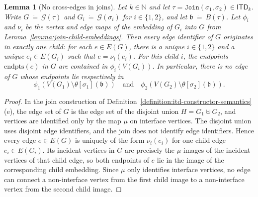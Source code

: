 \documentclass[11pt,a4paper]{article}
\newtheorem{lemma}[theorem]{Lemma}
\newcommand{\treewidthvalue}{k}
\newcommand{\decompositiongraph}[1]{\mathcal{G}(#1)}
\newcommand{\N}{\mathbb{N}}
\newcommand{\abag}{\mathfrak{b}}
\newcommand{\vertexset}[1]{V(#1)}
\newcommand{\edgeset}[1]{E(#1)}
\newcommand{\edgeendpointsname}{\mathrm{endpts}}
\newcommand{\anedge}{e}
\newcommand{\jointype}{\mathtt{Join}}
\newcommand{\topbagname}{B}
\newcommand{\topbag}[1]{\topbagname(#1)}
\newcommand{\allabstractdecompositionstreewidth}[1]{\mathsf{ITD}_{#1}}
\newcommand{\abstractdecomposition}{\tau}
\newcommand{\sigmaabstractdecomposition}{\sigma}
\newcommand{\defeq}{~\dot{=}~}
\newcommand{\topmapname}{\theta}
\newcommand{\topmap}[1]{\topmapname[#1]}
\begin{document}
\begin{lemma}[No cross-edges in joins]
\label{lemma:join-no-cross-edges}
Let $\treewidthvalue\in \N$ and let $\abstractdecomposition=\jointype(\sigmaabstractdecomposition_1,\sigmaabstractdecomposition_2)\in \allabstractdecompositionstreewidth{\treewidthvalue}$.
Write $G\defeq \decompositiongraph{\abstractdecomposition}$ and $G_i\defeq \decompositiongraph{\sigmaabstractdecomposition_i}$ for $i\in\{1,2\}$, and let $\abag\defeq \topbag{\abstractdecomposition}$.
Let $\phi_i$ and $\nu_i$ be the vertex and edge maps of the embedding of $G_i$ into $G$ from Lemma~\ref{lemma:join-child-embeddings}.
Then every edge identifier of $G$ originates in exactly one child: for each $\anedge\in \edgeset{G}$, there is a unique $i\in\{1,2\}$ and a unique $\anedge_i\in\edgeset{G_i}$ such that $\anedge=\nu_i(\anedge_i)$.
For this child $i$, the endpoints $\edgeendpointsname(\anedge)$ in $G$ are contained in $\phi_i(\vertexset{G_i})$.
In particular, there is no edge of $G$ whose endpoints lie respectively in
\[
\phi_1(\vertexset{G_1}\setminus \topmap{\sigmaabstractdecomposition_1}(\abag))
\quad\text{and}\quad
\phi_2(\vertexset{G_2}\setminus \topmap{\sigmaabstractdecomposition_2}(\abag)).
\]
\end{lemma}
\begin{proof}
In the join construction of Definition~\ref{definition:itd-constructor-semantics}(e), the edge set of $G$ is the edge set of the disjoint union $H=G_1\uplus G_2$, and vertices are identified only by the map $\mu$ on interface vertices.
The disjoint union uses disjoint edge identifiers, and the join does not identify edge identifiers. Hence every edge $\anedge\in \edgeset{G}$ is uniquely of the form $\nu_i(\anedge_i)$ for one child edge $\anedge_i\in\edgeset{G_i}$.
Its incident vertices in $G$ are precisely the $\mu$-images of the incident vertices of that child edge, so both endpoints of $\anedge$ lie in the image of the corresponding child embedding. Since $\mu$ only identifies interface vertices, no edge can connect a non-interface vertex from the first child image to a non-interface vertex from the second child image.
\end{proof}
\end{document}
